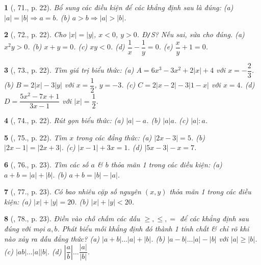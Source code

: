 \documentclass{article}
\newtheorem{baitoan}{}
\begin{document}
\begin{baitoan}[\cite{Binh_Toan_7_tap_1}, 71., p. 22]
	Bổ sung các điều kiện để các khẳng định sau là đúng: (a) $|a| = |b|\Rightarrow a = b$. (b) $a > b\Rightarrow|a| > |b|$.
\end{baitoan}

\begin{baitoan}[\cite{Binh_Toan_7_tap_1}, 72., p. 22]
	Cho $|x| = |y|$, $x < 0$, $y > 0$. {\rm Đ{\tt/}S?} Nếu sai, sửa cho đúng. (a) $x^2y > 0$. (b) $x + y = 0$. (c) $xy < 0$. (d) $\dfrac{1}{x} - \dfrac{1}{y} = 0$. (e) $\dfrac{x}{y} + 1 = 0$.	
\end{baitoan}

\begin{baitoan}[\cite{Binh_Toan_7_tap_1}, 73., p. 22]
	Tìm giá trị biểu thức: (a) $A = 6x^3 - 3x^2 + 2|x| + 4$ với $x = -\dfrac{2}{3}$. (b) $B = 2|x| - 3|y|$ với $x = \dfrac{1}{2}$, $y = -3$. (c) $C = 2|x - 2| - 3|1 - x|$ với $x = 4$. (d) $D = \dfrac{5x^2 - 7x + 1}{3x - 1}$ với $|x| = \dfrac{1}{2}$.	
\end{baitoan}

\begin{baitoan}[\cite{Binh_Toan_7_tap_1}, 74., p. 22]
	Rút gọn biểu thức: (a) $|a| - a$. (b) $|a|a$. (c) $|a|:a$.	
\end{baitoan}

\begin{baitoan}[\cite{Binh_Toan_7_tap_1}, 75., p. 22]
	Tìm $x$ trong các đẳng thức: (a) $|2x - 3| = 5$. (b) $|2x - 1| = |2x + 3|$. (c) $|x - 1| + 3x = 1$. (d) $|5x - 3| - x = 7$.	
\end{baitoan}

\begin{baitoan}[\cite{Binh_Toan_7_tap_1}, 76., p. 23]
	Tìm các số $a$ \& $b$ thỏa mãn 1 trong các điều kiện: (a) $a + b = |a| + |b|$. (b) $a + b = |b| - |a|$.	
\end{baitoan}

\begin{baitoan}[\cite{Binh_Toan_7_tap_1}, 77., p. 23]
	Có bao nhiêu cặp số nguyên $(x,y)$ thỏa mãn 1 trong các điều kiện: (a) $|x| + |y| = 20$. (b) $|x| + |y| < 20$.	
\end{baitoan}

\begin{baitoan}[\cite{Binh_Toan_7_tap_1}, 78., p. 23]
	Điền vào chỗ chấm các dấu $\ge,\le,=$ để các khẳng định sau đúng với mọi $a,b$. Phát biểu mỗi khẳng định đó thành 1 tính chất \& chỉ rõ khi nào xảy ra dấu đẳng thức? (a) $|a + b|\ldots|a| + |b|$. (b) $|a - b|\ldots|a| - |b|$ với $|a|\ge|b|$. (c) $|ab|\ldots|a||b|$. (d) $\left|\dfrac{a}{b}\right|\ldots\dfrac{|a|}{|b|}$.	
\end{baitoan}
\end{document}
